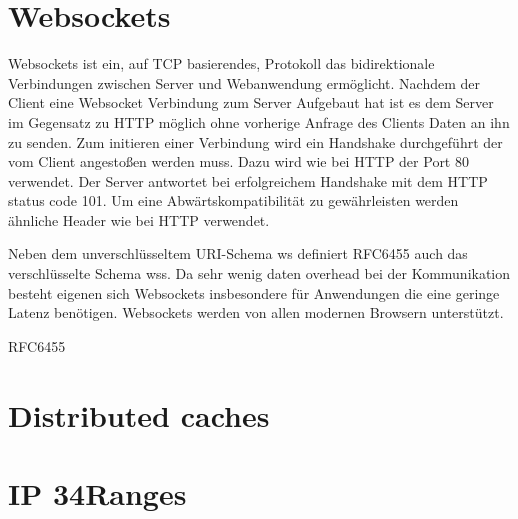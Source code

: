 \section{Websockets}


Websockets ist ein, auf TCP basierendes, Protokoll das bidirektionale Verbindungen zwischen Server und Webanwendung ermöglicht. Nachdem der Client eine Websocket Verbindung zum Server Aufgebaut hat ist es dem Server im Gegensatz zu HTTP möglich ohne vorherige Anfrage des Clients Daten an ihn zu senden. Zum initieren einer Verbindung wird ein Handshake durchgeführt der vom Client angestoßen werden muss. Dazu wird wie bei HTTP der Port 80 verwendet. Der Server antwortet bei erfolgreichem Handshake mit dem HTTP status code 101. Um eine Abwärtskompatibilität zu gewährleisten werden ähnliche Header wie bei HTTP verwendet.

Neben dem unverschlüsseltem URI-Schema ws definiert RFC6455\cite{rfcWebsockets} auch das verschlüsselte Schema wss. Da  sehr wenig daten overhead bei der Kommunikation besteht eigenen sich Websockets insbesondere für Anwendungen die eine geringe Latenz benötigen. Websockets werden von allen modernen Browsern unterstützt.

%
%
%
% 
%  


RFC6455\cite{rfcWebsockets}


\section{Distributed caches}
\section{IP 34Ranges}



